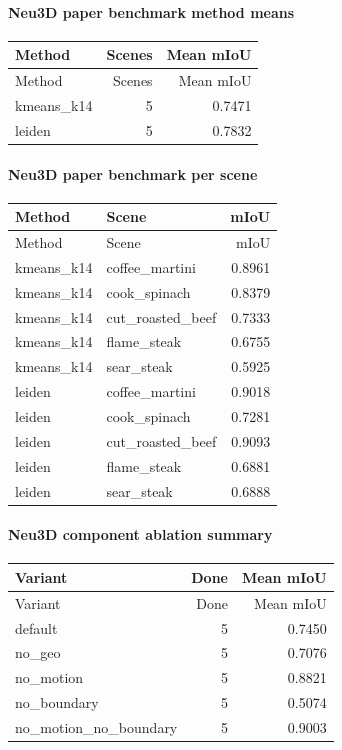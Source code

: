 \documentclass[10pt]{article}
\begin{document}
\paragraph{Neu3D paper benchmark method means}
\small
\begin{longtable}{lrr}
\toprule
Method & Scenes & Mean mIoU \\
\midrule
\endfirsthead
\toprule
Method & Scenes & Mean mIoU \\
\midrule
\endhead
kmeans\_k14 & 5 & 0.7471 \\
leiden & 5 & 0.7832 \\
\bottomrule
\end{longtable}
\normalsize

\paragraph{Neu3D paper benchmark per scene}
\small
\begin{longtable}{llr}
\toprule
Method & Scene & mIoU \\
\midrule
\endfirsthead
\toprule
Method & Scene & mIoU \\
\midrule
\endhead
kmeans\_k14 & coffee\_martini & 0.8961 \\
kmeans\_k14 & cook\_spinach & 0.8379 \\
kmeans\_k14 & cut\_roasted\_beef & 0.7333 \\
kmeans\_k14 & flame\_steak & 0.6755 \\
kmeans\_k14 & sear\_steak & 0.5925 \\
leiden & coffee\_martini & 0.9018 \\
leiden & cook\_spinach & 0.7281 \\
leiden & cut\_roasted\_beef & 0.9093 \\
leiden & flame\_steak & 0.6881 \\
leiden & sear\_steak & 0.6888 \\
\bottomrule
\end{longtable}
\normalsize

\paragraph{Neu3D component ablation summary}
\small
\begin{longtable}{lrr}
\toprule
Variant & Done & Mean mIoU \\
\midrule
\endfirsthead
\toprule
Variant & Done & Mean mIoU \\
\midrule
\endhead
default & 5 & 0.7450 \\
no\_geo & 5 & 0.7076 \\
no\_motion & 5 & 0.8821 \\
no\_boundary & 5 & 0.5074 \\
no\_motion\_no\_boundary & 5 & 0.9003 \\
\bottomrule
\end{longtable}
\normalsize
\end{document}
